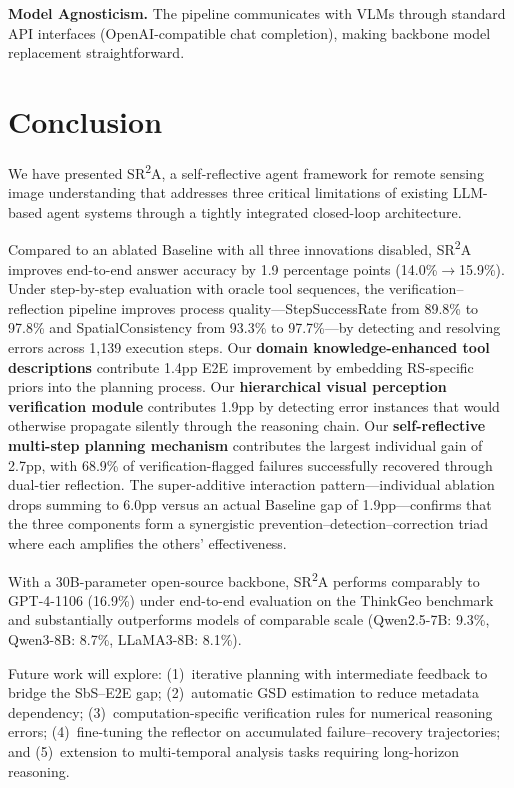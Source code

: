 \documentclass[journal]{IEEEtran}
\begin{document}
\textbf{Model Agnosticism.}
The pipeline communicates with VLMs through standard API interfaces (OpenAI-compatible chat completion), making backbone model replacement straightforward.


\section{Conclusion}
\label{sec:conclusion}

We have presented SR\textsuperscript{2}A, a self-reflective agent framework for remote sensing image understanding that addresses three critical limitations of existing LLM-based agent systems through a tightly integrated closed-loop architecture.

Compared to an ablated Baseline with all three innovations disabled, SR\textsuperscript{2}A improves end-to-end answer accuracy by 1.9 percentage points (14.0\%$\rightarrow$15.9\%).
Under step-by-step evaluation with oracle tool sequences, the verification--reflection pipeline improves process quality---StepSuccessRate from 89.8\% to 97.8\% and SpatialConsistency from 93.3\% to 97.7\%---by detecting and resolving errors across 1{,}139 execution steps.
Our \textbf{domain knowledge-enhanced tool descriptions} contribute 1.4pp E2E improvement by embedding RS-specific priors into the planning process.
Our \textbf{hierarchical visual perception verification module} contributes 1.9pp by detecting error instances that would otherwise propagate silently through the reasoning chain.
Our \textbf{self-reflective multi-step planning mechanism} contributes the largest individual gain of 2.7pp, with 68.9\% of verification-flagged failures successfully recovered through dual-tier reflection.
The super-additive interaction pattern---individual ablation drops summing to 6.0pp versus an actual Baseline gap of 1.9pp---confirms that the three components form a synergistic prevention--detection--correction triad where each amplifies the others' effectiveness.

With a 30B-parameter open-source backbone, SR\textsuperscript{2}A performs comparably to GPT-4-1106 (16.9\%) under end-to-end evaluation on the ThinkGeo benchmark and substantially outperforms models of comparable scale (Qwen2.5-7B: 9.3\%, Qwen3-8B: 8.7\%, LLaMA3-8B: 8.1\%).

Future work will explore: (1)~iterative planning with intermediate feedback to bridge the SbS--E2E gap; (2)~automatic GSD estimation to reduce metadata dependency; (3)~computation-specific verification rules for numerical reasoning errors; (4)~fine-tuning the reflector on accumulated failure--recovery trajectories; and (5)~extension to multi-temporal analysis tasks requiring long-horizon reasoning.
\end{document}
